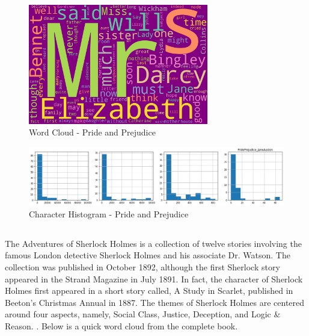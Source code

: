 \begin{figure}[H]
	\begin{center}
		\includegraphics[width = 0.7\textwidth]{Images/PridePrejudice_JaneAusten.jpeg} %
		\caption{Word Cloud - Pride and Prejudice}
		\label{fig:pride-prejudice}
	\end{center}
\end{figure}

\begin{figure}[H]
	\begin{center}
		\includegraphics[width = 1.0\textwidth]{Images/char_hist_PridePrejudice_JaneAusten.jpeg} %
		\caption{Character Histogram - Pride and Prejudice}
		\label{fig:histogram-prideprejudice}
	\end{center}
\end{figure}



\subsection{\textcite{sherlock-holmes}} %
\label{sec:sherlock-holmes} %

The Adventures of Sherlock Holmes is a collection of twelve stories involving the famous London detective Sherlock Holmes and his associate Dr. Watson. The collection was published in October 1892, although the first Sherlock story appeared in the Strand Magazine in July 1891. In fact, the character of Sherlock Holmes first appeared in a short story called, A Study in Scarlet, published in Beeton's Christmas Annual in 1887. The themes of Sherlock Holmes are centered around four aspects, namely, Social Class, Justice, Deception, and Logic & Reason. \textcite{sherlock-holmes-summary}. Below is a quick word cloud from the complete book. 

